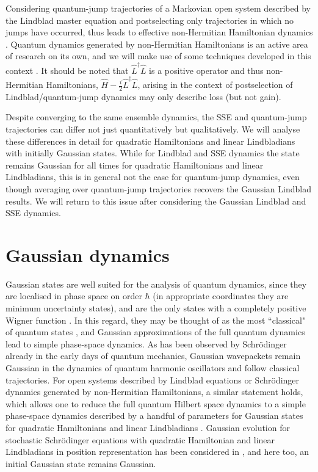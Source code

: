 \documentclass[12pt]{iopart} %
\begin{document}
Considering quantum-jump trajectories of a Markovian open system described by the Lindblad master equation and postselecting only trajectories in which no jumps have occurred, thus leads to effective non-Hermitian Hamiltonian dynamics \cite{daley2014quantum,klauck2019observation,graefenatphoton}. Quantum dynamics generated by non-Hermitian Hamiltonians is an active area of research on its own, and we will make use of some techniques developed in this context \cite{graefe2012complexified,lasser2018non}. It should be noted that $\hat L^{\dagger}\hat L$ is a positive operator and thus non-Hermitian Hamiltonians, $\hat H-\frac{i}{2}\hat L^{\dagger}\hat L$, arising in the context of postselection of Lindblad/quantum-jump dynamics may only describe loss (but not gain). 

Despite converging to the same ensemble dynamics, the SSE and quantum-jump trajectories can differ not just quantitatively but qualitatively. We will analyse these differences in detail for quadratic Hamiltonians and linear Lindbladians with initially Gaussian states. While for Lindblad and SSE dynamics the state remains Gaussian for all times for quadratic Hamiltonians and linear Lindbladians, this is in general not the case for quantum-jump dynamics, even though averaging over quantum-jump trajectories recovers the Gaussian Lindblad results. We will return to this issue after considering the Gaussian Lindblad and SSE dynamics. 
 
\section{Gaussian dynamics} \label{sec:GaussDyn}

Gaussian states are well suited for the analysis of quantum dynamics, since they are localised in phase space on order $\hbar$ (in appropriate coordinates they are minimum uncertainty states), and are the only states with a completely positive Wigner function \cite{hudson1974wigner}. In this regard, they may be thought of as the most ``classical" of quantum states \cite{Wignegnegativity}, and Gaussian approximations of the full quantum dynamics lead to simple phase-space dynamics. As has been observed by Schr\"odinger already in the early days of quantum mechanics, Gaussian wavepackets remain Gaussian in the dynamics of quantum harmonic oscillators and follow classical trajectories. For open systems described by Lindblad equations or Schr\"odinger dynamics generated by non-Hermitian Hamiltonians, a similar statement holds, which allows one to reduce the full quantum Hilbert space dynamics to a simple phase-space dynamics described by a handful of parameters for Gaussian states for quadratic Hamiltonians and linear Lindbladians \cite{graefe2012complexified,de2002propagation,graefebradley}. Gaussian evolution for stochastic Schr\"odinger equations with quadratic Hamiltonian and linear Lindbladians in position representation has been considered in \cite{halliwell1995quantum,strunz1997path,strunz1999quantum}, and here too, an initial Gaussian state remains Gaussian. 
\end{document}
